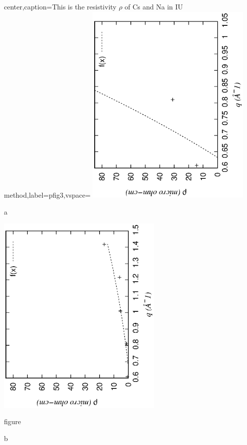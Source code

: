 \documentclass[final,12pt]{elsarticle}
\begin{document}
{\begin{adjustbox}{center,caption={This is the resistivity $\rho$ of Cs and Na in IU method},label={pfig3},vspace=\bigskipamount}
	\includegraphics[width=0.6\textwidth,angle=-90]{irCs.eps}
	\caption[short]{a}
	\includegraphics[width=0.6\textwidth,angle=-90]{irNa.eps}
	\caption{figure}{b}
\end{adjustbox}

}
\end{document}
